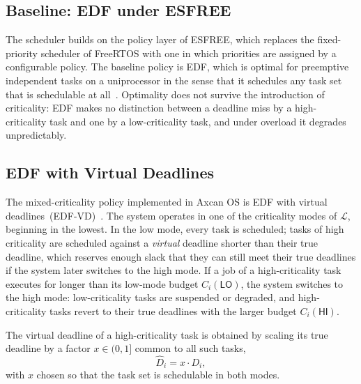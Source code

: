 \subsection{Baseline: EDF under ESFREE}\label{subsec:os:edf}

The scheduler builds on the policy layer of ESFREE, which replaces the
fixed-priority scheduler of FreeRTOS with one in which priorities are assigned
by a configurable policy. The baseline policy is EDF, which is optimal for
preemptive independent tasks on a uniprocessor in the sense that it schedules
any task set that is schedulable at all~\parencite{liu1973, dertouzos1974}.
Optimality does not survive the introduction of criticality: EDF makes no
distinction between a deadline miss by a high-criticality task and one by a
low-criticality task, and under overload it degrades unpredictably.

\subsection{EDF with Virtual Deadlines}\label{subsec:os:edfvd}

The mixed-criticality policy implemented in Axcan OS is EDF with virtual
deadlines~(EDF-VD)~\parencite{baruah_edfvd}. The system operates in one of the
criticality modes of $\mathcal{L}$, beginning in the lowest. In the low mode,
every task is scheduled; tasks of high criticality are scheduled against a
\emph{virtual} deadline shorter than their true deadline, which reserves
enough slack that they can still meet their true deadlines if the system later
switches to the high mode. If a job of a high-criticality task executes for
longer than its low-mode budget $C_i(\textsf{LO})$, the system switches to the
high mode: low-criticality tasks are suspended or degraded, and
high-criticality tasks revert to their true deadlines with the larger budget
$C_i(\textsf{HI})$.

The virtual deadline of a high-criticality task is obtained by scaling its
true deadline by a factor $x \in (0,1]$ common to all such tasks,
%
\begin{equation}\label{eq:virtualdeadline}
  \hat{D}_i = x \cdot D_i ,
\end{equation}
%
with $x$ chosen so that the task set is schedulable in both modes.

